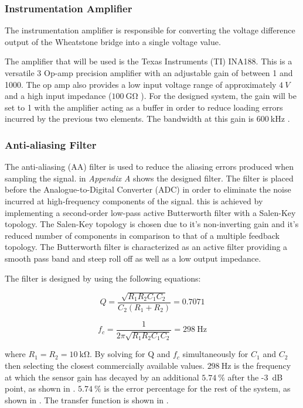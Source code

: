 \documentclass[10pt,twocolumn]{witseiepaper}
\begin{document}
\subsubsection{Instrumentation Amplifier}

The instrumentation amplifier is responsible for converting the voltage difference output of the Wheatstone bridge into a single voltage value.

The amplifier that will be used is the Texas Instruments (TI) INA188. This is a versatile 3 Op-amp precision amplifier with an adjustable gain of between 1 and 1000. The op amp also provides a low input voltage range of approximately $4~V$ and a high input impedance ($100~\mathrm{G\Omega}$ \cite{ina188}). For the designed system, the gain will be set to 1 with the amplifier acting as a buffer in order to reduce loading errors incurred by the previous two elements. The bandwidth at this gain is $600~\mathrm{kHz}$ \cite{ina188}.

\subsubsection{Anti-aliasing Filter}

The anti-aliasing (AA) filter is used to reduce the aliasing errors produced when sampling the signal.  in \textit{Appendix A} shows the designed filter. The filter is placed before the Analogue-to-Digital Converter (ADC) in order to eliminate the noise incurred at high-frequency components of the signal. this is achieved by implementing a second-order low-pass active Butterworth filter with a Salen-Key topology. The Salen-Key topology is chosen due to it's non-inverting gain and it's reduced number of components in comparison to that of a multiple feedback topology. The Butterworth filter is characterized as an active filter providing a smooth pass band and steep roll off as well as a low output impedance.

The filter is designed by using the following equations:

\begin{equation}
	Q =  \frac{\sqrt{R_1 R_2 C_1 C_2}}{C_2 (R_1 + R_2)} = 0.7071
\end{equation}

\begin{equation}
	f_c = \frac{1}{2 \pi \sqrt{R_1 R_2 C_1 C_2}} = 298~\mathrm{Hz}
\end{equation}

where $R_1 = R_2 = 10~\mathrm{k\Omega}$. By solving for Q and $f_c$ simultaneously for $C_1$ and $C_2$ then selecting the closest commercially available values. $298~\mathrm{Hz}$ is the frequency at which the sensor gain has decayed by an additional $5.74~\%$ after the -3~dB point, as shown in . $5.74~\%$ is the error percentage for the rest of the system, as shown in . The transfer function is shown in .
\end{document}
